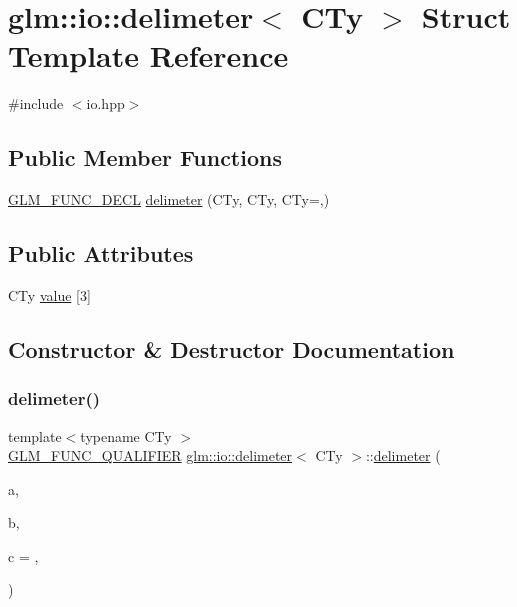 \hypertarget{structglm_1_1io_1_1delimeter}{}\section{glm\+:\+:io\+:\+:delimeter$<$ C\+Ty $>$ Struct Template Reference}
\label{structglm_1_1io_1_1delimeter}


{\ttfamily \#include $<$io.\+hpp$>$}

\subsection*{Public Member Functions}
\begin{DoxyCompactItemize}
\item 
\mbox{\hyperlink{setup_8hpp_ab2d052de21a70539923e9bcbf6e83a51}{G\+L\+M\+\_\+\+F\+U\+N\+C\+\_\+\+D\+E\+CL}} \mbox{\hyperlink{structglm_1_1io_1_1delimeter_a5c1db62fae08a4c96eaf336781a4b53d}{delimeter}} (C\+Ty, C\+Ty, C\+Ty=\textquotesingle{},\textquotesingle{})
\end{DoxyCompactItemize}
\subsection*{Public Attributes}
\begin{DoxyCompactItemize}
\item 
C\+Ty \mbox{\hyperlink{structglm_1_1io_1_1delimeter_a9ade129dae50c4f716f724e7425f9c68}{value}} \mbox{[}3\mbox{]}
\end{DoxyCompactItemize}


\subsection{Constructor \& Destructor Documentation}
\mbox{\label{structglm_1_1io_1_1delimeter_a5c1db62fae08a4c96eaf336781a4b53d}} 
\subsubsection{\texorpdfstring{delimeter()}{delimeter()}}
{\footnotesize\ttfamily template$<$typename C\+Ty $>$ \\
\mbox{\hyperlink{setup_8hpp_a33fdea6f91c5f834105f7415e2a64407}{G\+L\+M\+\_\+\+F\+U\+N\+C\+\_\+\+Q\+U\+A\+L\+I\+F\+I\+ER}} \mbox{\hyperlink{structglm_1_1io_1_1delimeter}{glm\+::io\+::delimeter}}$<$ C\+Ty $>$\+::\mbox{\hyperlink{structglm_1_1io_1_1delimeter}{delimeter}} (\begin{DoxyParamCaption}\item[{C\+Ty}]{a,  }\item[{C\+Ty}]{b,  }\item[{C\+Ty}]{c = {\ttfamily \textquotesingle{},\textquotesingle{}} }\end{DoxyParamCaption})\hspace{0.3cm}{\ttfamily [explicit]}}



